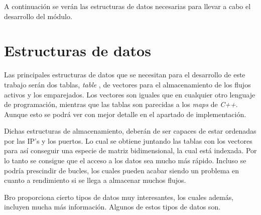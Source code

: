 \intro A continuación se verán las estructuras de datos necesarias para llevar a cabo el desarrollo del módulo.

\section{Estructuras de datos}

Las principales estructuras de datos que se necesitan para el desarrollo de este trabajo serán dos 
tablas, \textit{table} \cite{brotable}, de vectores para el almacenamiento de los flujos activos y los emparejados. 
Los vectores son iguales que en cualquier otro lenguaje de programación, mientras que las tablas son parecidas a los \textit{maps} de \textit{C++}. Aunque esto se podrá ver con mejor detalle en el apartado de implementación.

\intro Dichas estructuras de almacenamiento, deberán de ser capaces de estar ordenadas por las IP's y los puertos. 
Lo cual se obtiene juntando las tablas con los vectores para así conseguir una especie de matriz bidimensional, 
la cual está indexada. Por lo tanto se consigue que el acceso a los datos sea mucho más rápido. Incluso se podría 
prescindir de bucles, los cuales pueden acabar siendo un problema en cuanto a rendimiento si se llega a almacenar 
muchos flujos.

\intro Bro proporciona cierto tipos de datos muy interesantes, los cuales además, incluyen mucha más información. 
Algunos de estos tipos de datos son. 

